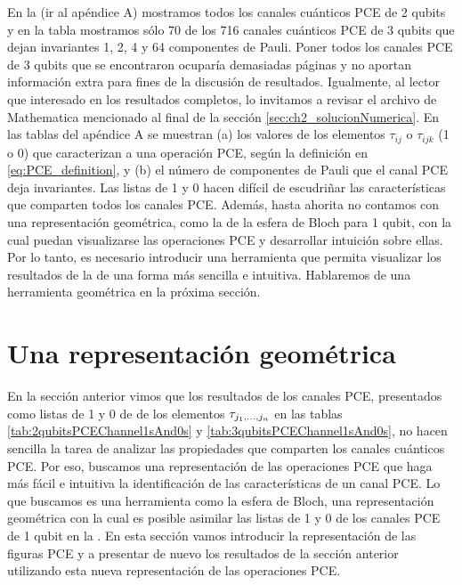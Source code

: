 En la  (ir al apéndice A) mostramos
todos los canales cuánticos PCE de 2 qubits y en la tabla 
 mostramos sólo 
70 de los 716 canales cuánticos PCE de 3 qubits que dejan invariantes 
1, 2, 4 y 64 componentes de Pauli. Poner todos los canales PCE de 3 
qubits que se encontraron ocuparía demasiadas páginas y no aportan 
información extra para fines de la discusión de resultados.
Igualmente, al lector que interesado en los resultados completos,
lo invitamos a revisar el archivo de Mathematica mencionado 
al final de la sección \ref{sec:ch2_solucionNumerica}. 
En las tablas del apéndice A se muestran
(a) los valores de los elementos $\tau_{ij}$ o $\tau_{ijk}$ (1 o 0) que caracterizan 
a una operación PCE, según la definición en \eqref{eq:PCE_definition},
y (b) el número de componentes de Pauli que el canal PCE
deja invariantes. Las listas de 1 y 0 hacen difícil de escudriñar
las características que comparten todos los canales PCE.
Además, hasta ahorita no contamos con una representación geométrica, 
como la de la esfera de Bloch para 1 qubit, con la cual puedan visualizarse 
las operaciones PCE y desarrollar intuición sobre ellas.
Por lo tanto, es necesario introducir una herramienta
que permita visualizar los resultados de la 
de una forma más sencilla e intuitiva. Hablaremos de una herramienta geométrica
en la próxima sección.


\section{Una representación geométrica}\label{sec:ch3_geometric_representation} %

En la sección anterior vimos que los resultados de los canales PCE,
presentados como listas de 1 y 0 
de de los elementos $\tau_{j_1,\ldots ,j_n}$ en las tablas \ref{tab:2qubitsPCEChannel1sAnd0s} y 
\ref{tab:3qubitsPCEChannel1sAnd0s}, no hacen sencilla la tarea de analizar 
las propiedades que comparten los canales cuánticos PCE. Por eso, 
buscamos una representación de las operaciones PCE que haga más fácil 
e intuitiva la identificación de las características de un canal PCE. 
Lo que buscamos es una herramienta como la esfera de Bloch, 
una representación geométrica con la cual es posible asimilar las listas 
de 1 y 0 de los canales PCE de 1 qubit en la .  
En esta sección vamos introducir la representación de las figuras PCE 
y a presentar de nuevo los resultados de la sección anterior 
utilizando esta nueva representación de las operaciones PCE.

